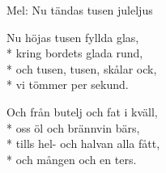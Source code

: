 \begin{SongText}
    \begin{SongVerse}
        Mel: Nu tändas tusen juleljus
    \end{SongVerse}
    \begin{SongVerse}
        Nu höjas tusen fyllda glas,\\*%
        kring bordets glada rund,\\*%
        och tusen, tusen, skålar ock,\\*%
        vi tömmer per sekund.
    \end{SongVerse}
    \begin{SongVerse}
        Och från butelj och fat i kväll,\\*%
        oss öl och brännvin bärs,\\*%
        tills hel- och halvan alla fått,\\*%
        och mången och en ters.
    \end{SongVerse}
\end{SongText}
